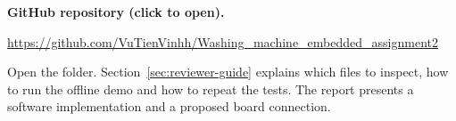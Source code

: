 \documentclass[11pt,a4paper]{article}
\begin{document}

\tableofcontents
\thispagestyle{plain}
\vfill
\noindent\textbf{GitHub repository (click to open).}\par
{\small\url{https://github.com/VuTienVinhh/Washing_machine_embedded_assignment2}}\par
Open the  folder. Section~\ref{sec:reviewer-guide}
explains which files to inspect, how to run the offline demo and how to repeat
the tests. The report presents a software implementation and a proposed board connection.
\clearpage
{}

\clearpage

\clearpage

\clearpage

\clearpage

\clearpage

\clearpage

\clearpage

\end{document}

